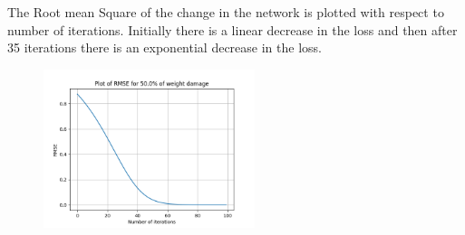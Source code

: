 \documentclass{article}
\begin{document}
\begin{figure}[H]
\hspace{0.001\textwidth}
\end{figure}

The Root mean Square of the change in the network is plotted with respect to number of iterations. Initially there is a linear decrease in the loss and then after 35 iterations there is an exponential decrease in the loss.
\begin{figure}[H]
\includegraphics[width=0.55\textwidth]{Figure_311.png}
\centering
\end{figure}
\end{document}
